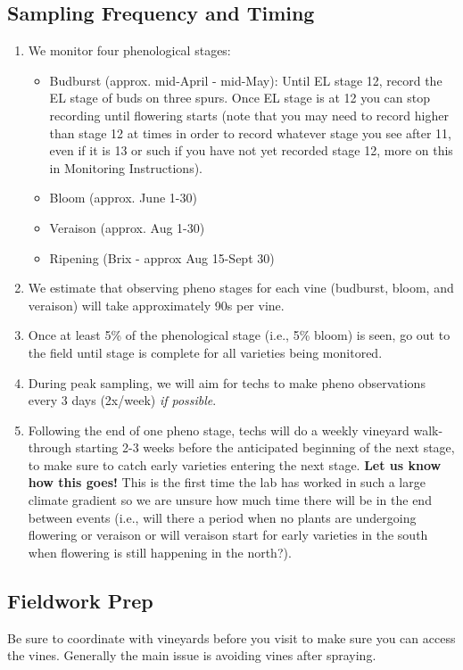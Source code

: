 \documentclass[11pt,letter]{article}
\newenvironment{smitemize}{
\begin{itemize}
  \setlength{\itemsep}{0pt}
  \setlength{\parskip}{0.8pt}
  \setlength{\parsep}{0pt}}
{\end{itemize}
}
\begin{document}
\subsection{Sampling Frequency and Timing}

\begin{enumerate}
\item We monitor four phenological stages: 
	\begin{smitemize}
	\item Budburst (approx. mid-April - mid-May): Until EL stage 12, record the EL stage of buds on three spurs. Once EL stage is at 12 you can stop recording until flowering starts (note that you may need to record higher than stage 12 at times in order to record whatever stage you see after 11, even if it is 13 or such if you have not yet recorded stage 12, more on this in Monitoring Instructions).
	\item Bloom (approx. June 1-30)
	\item Veraison (approx. Aug 1-30)
	\item Ripening (Brix - approx Aug 15-Sept 30)
	\end{smitemize}
\item We estimate that observing pheno stages for each vine (budburst, bloom, and veraison) will take approximately 90s per vine. 
\item Once at least 5\% of the phenological stage (i.e., 5\% bloom) is seen, go out to the field until stage is complete for all varieties being monitored. 
\item During peak sampling, we will aim for techs to make pheno observations every 3 days (2x/week) \emph{if possible}.  
\item Following the end of one pheno stage, techs will do a weekly vineyard walk-through starting 2-3 weeks before the anticipated beginning of the next stage, to make sure to catch early varieties entering the next stage. {\bf Let us know how this goes!} This is the first time the lab has worked in such a large climate gradient so we are unsure how much time there will be in the end between events (i.e., will there a period when no plants are undergoing flowering or veraison or will veraison start for early varieties in the south when flowering is still happening in the north?).
\end{enumerate}

\subsection{Fieldwork Prep}
Be sure to coordinate with vineyards before you visit to make sure you can access the vines. Generally the main issue is avoiding vines after spraying.\\
\end{document}
